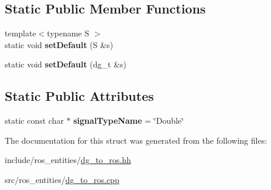 \subsection*{Static Public Member Functions}
\begin{DoxyCompactItemize}
\item 
\mbox{\label{structdynamic__graph_1_1DgToRos_3_01double_01_4_ab21237e1e16bdb81d3c31f3be382b8ad}} 
{\footnotesize template$<$typename S $>$ }\\static void {\bfseries set\+Default} (S \&s)
\item 
\mbox{\label{structdynamic__graph_1_1DgToRos_3_01double_01_4_ad6ad3bc75e6e7d80d44fa9d4c9eee4ea}} 
static void {\bfseries set\+Default} (dg\+\_\+t \&s)
\end{DoxyCompactItemize}
\subsection*{Static Public Attributes}
\begin{DoxyCompactItemize}
\item 
\mbox{\label{structdynamic__graph_1_1DgToRos_3_01double_01_4_a686b38d74e19c6de7308e8d1ae86cf8c}} 
static const char $\ast$ {\bfseries signal\+Type\+Name} = \char`\"{}Double\char`\"{}
\end{DoxyCompactItemize}


The documentation for this struct was generated from the following files\+:\begin{DoxyCompactItemize}
\item 
include/ros\+\_\+entities/\hyperlink{dg__to__ros_8hh}{dg\+\_\+to\+\_\+ros.\+hh}\item 
src/ros\+\_\+entities/\hyperlink{dg__to__ros_8cpp}{dg\+\_\+to\+\_\+ros.\+cpp}\end{DoxyCompactItemize}
